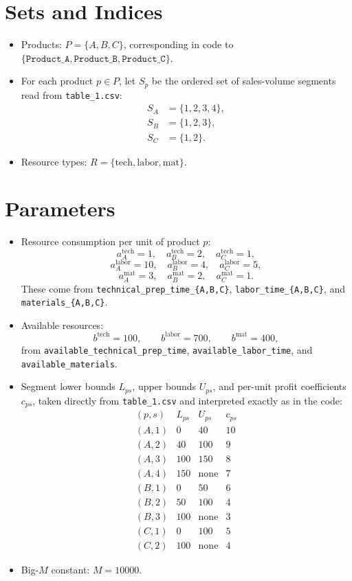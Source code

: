 \section*{Sets and Indices}

\begin{itemize}
    \item Products: \(P=\{A,B,C\}\), corresponding in code to \(\{\texttt{Product\_A},\texttt{Product\_B},\texttt{Product\_C}\}\).
    \item For each product \(p\in P\), let \(S_p\) be the ordered set of sales-volume segments read from \texttt{table\_1.csv}:
    \[
    \begin{aligned}
    S_A &= \{1,2,3,4\},\\
    S_B &= \{1,2,3\},\\
    S_C &= \{1,2\}.
    \end{aligned}
    \]
    \item Resource types: \(R=\{\text{tech},\text{labor},\text{mat}\}\).
\end{itemize}

\section*{Parameters}

\begin{itemize}
    \item Resource consumption per unit of product \(p\):
    \[
    a^{\text{tech}}_A=1,\quad a^{\text{tech}}_B=2,\quad a^{\text{tech}}_C=1,
    \]
    \[
    a^{\text{labor}}_A=10,\quad a^{\text{labor}}_B=4,\quad a^{\text{labor}}_C=5,
    \]
    \[
    a^{\text{mat}}_A=3,\quad a^{\text{mat}}_B=2,\quad a^{\text{mat}}_C=1.
    \]
    These come from \texttt{technical\_prep\_time\_\{A,B,C\}}, \texttt{labor\_time\_\{A,B,C\}}, and \texttt{materials\_\{A,B,C\}}.
    \item Available resources:
    \[
    b^{\text{tech}}=100,\qquad b^{\text{labor}}=700,\qquad b^{\text{mat}}=400,
    \]
    from \texttt{available\_technical\_prep\_time}, \texttt{available\_labor\_time}, and \texttt{available\_materials}.
    \item Segment lower bounds \(L_{ps}\), upper bounds \(U_{ps}\), and per-unit profit coefficients \(c_{ps}\), taken directly from \texttt{table\_1.csv} and interpreted exactly as in the code:
    \[
    \begin{array}{c|ccc}
    (p,s) & L_{ps} & U_{ps} & c_{ps}\\ \hline
    (A,1) & 0 & 40 & 10\\
    (A,2) & 40 & 100 & 9\\
    (A,3) & 100 & 150 & 8\\
    (A,4) & 150 & \text{none} & 7\\
    (B,1) & 0 & 50 & 6\\
    (B,2) & 50 & 100 & 4\\
    (B,3) & 100 & \text{none} & 3\\
    (C,1) & 0 & 100 & 5\\
    (C,2) & 100 & \text{none} & 4
    \end{array}
    \]
    \item Big-\(M\) constant: \(M=10000\).
\end{itemize}

